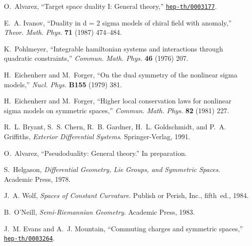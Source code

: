 \documentclass[a4paper,12pt]{article}
\begin{document}
\begin{thebibliography}{10}
O.~Alvarez, ``Target space duality {I}: General theory,''
\href{http://www.arXiv.org/abs/hep-th/0003177}{{\tt hep-th/0003177}}.

E.~A. Ivanov, ``Duality in d = 2 sigma models of chiral field with anomaly,''
  {\em Theor. Math. Phys.} {\bf 71} (1987)
474--484.

K.~Pohlmeyer, ``Integrable hamiltonian systems and interactions through
  quadratic constraints,'' {\em Commun. Math. Phys.} {\bf 46} (1976)
207.

H.~Eichenherr and M.~Forger, ``On the dual symmetry of the nonlinear sigma
  models,'' {\em Nucl. Phys.} {\bf B155} (1979)
381.

H.~Eichenherr and M.~Forger, ``Higher local conservation laws for nonlinear
  sigma models on symmetric spaces,'' {\em Commun. Math. Phys.} {\bf 82} (1981)
227.

R.~L. Bryant, S.~S. Chern, R.~B. Gardner, H.~L. Goldschmidt, and P.~A.
  Griffiths, {\em Exterior Differential Systems}.
\newblock Springer-Verlag, 1991.

O.~Alvarez, ``Pseudoduality: General theory.'' In preparation.

S.~Helgason, {\em Differential Geometry, Lie Groups, and Symmetric Spaces}.
\newblock Academic Press, 1978.

J.~A. Wolf, {\em Spaces of Constant Curvature}.
\newblock Publish or Perish, Inc., fifth~ed., 1984.

B.~O'Neill, {\em Semi-{R}iemannian Geometry}.
\newblock Academic Press, 1983.

J.~M. Evans and A.~J. Mountain, ``Commuting charges and symmetric spaces,''
\href{http://www.arXiv.org/abs/hep-th/0003264}{{\tt hep-th/0003264}}.

\end{thebibliography}\endgroup
\end{document}
